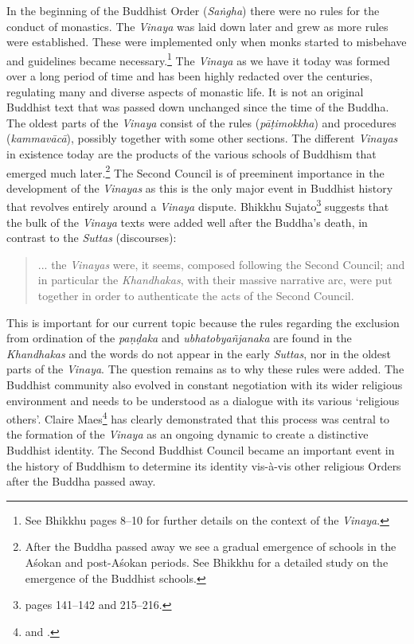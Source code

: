 In the beginning of the Buddhist Order ({\em Saṅgha}) there were no rules for the conduct of monastics. The {\em Vinaya} was laid down later and grew as more rules were established. These were implemented only when monks started to misbehave and guidelines became necessary.\footnote{See Bhikkhu \cite{sujato2009} pages 8–10 for further details on the context of the {\em Vinaya}.} The {\em Vinaya} as we have it today was formed over a long period of time and has been highly redacted over the centuries, regulating many and diverse aspects of monastic life. It is not an original Buddhist text that was passed down unchanged since the time of the Buddha. The oldest parts of the {\em Vinaya} consist of the rules ({\em pāṭimokkha}) and procedures ({\em kammavācā}), possibly together with some other sections. The different {\em Vinayas} in existence today are the products of the various schools of Buddhism that emerged much later.\footnote{After the Buddha passed away we see a gradual emergence of schools in the Aśokan and post-Aśokan periods. See Bhikkhu \cite{sujato2012} for a detailed study on the emergence of the Buddhist schools.} The Second Council is of preeminent importance in the development of the {\em Vinayas} as this is the only major event in Buddhist history that revolves entirely around a {\em Vinaya} dispute. Bhikkhu Sujato\footnote{\cite{sujato2009} pages 141–142 and 215–216.} suggests that the bulk of the {\em Vinaya} texts were added well after the Buddha's death, in contrast to the {\em Suttas} (discourses): 

\begin{quote}
... the {\em Vinayas} were, it seems, composed following the Second Council; and in particular the {\em Khandhakas}, with their massive narrative arc, were put together in order to authenticate the acts of the Second Council.
\end{quote}

This is important for our current topic because the rules regarding the exclusion from ordination of the {\em paṇḍaka} and {\em ubhatob­yañ­janaka} are found in the {\em Khandhakas} and the words do not appear in the early {\em Suttas}, nor in the oldest parts of the {\em Vinaya}. The question remains as to why these rules were added. The Buddhist community also evolved in constant negotiation with its wider religious environment and needs to be understood as a dialogue with its various `religious others'. Claire Maes\footnote{\cite{maes} and \cite{maes2016}.} has clearly demonstrated that this process was central to the formation of the {\em Vinaya} as an ongoing dynamic to create a distinctive Buddhist identity. The Second Buddhist Council became an important event in the history of Buddhism to determine its identity vis-à-vis other religious Orders after the Buddha passed away.

